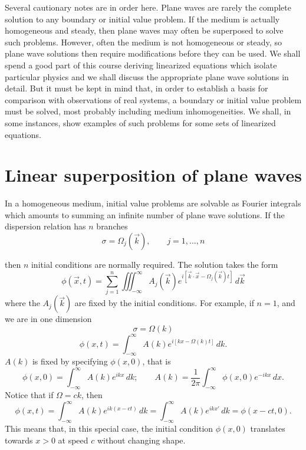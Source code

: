 Several cautionary notes are in order here. Plane waves are rarely the complete solution
to any boundary or initial value problem. If the medium is actually homogeneous and
steady, then plane waves may often be superposed to solve such problems. However,
often the medium is not homogeneous or steady, so plane wave solutions then require
modifications before they can be used. We shall spend a good part of this course
deriving linearized equations which isolate particular physics and we shall discuss the
appropriate plane wave solutions in detail. But it must be kept in mind that, in order
to establish a basis for comparison with observations of real systems, a boundary or
initial value problem must be solved, most probably including medium inhomogeneities.
We shall, in some instances, show examples of such problems for some sets of linearized
equations.

\section{Linear superposition of plane waves}

In a homogeneous medium, initial value problems are solvable as Fourier integrals which
amounts to summing an infinite number of plane wave solutions. If the dispersion
relation has $n$ branches
\[
	\sigma=\Omega_j(\vec{k}),\qquad j=1,\ldots,n
\]

\sourcepagebreak

then $n$ initial conditions are normally required. The solution takes the form
\[
	\phi(\vec{x},t)=\sum_{j=1}^n
	\iiint_{-\infty}^{\infty}
	A_j(\vec{k})e^{i[\vec{k}\cdot\vec{x}-\Omega_j(\vec{k})t]}
	\,d\vec{k}
\]
where the $A_j(\vec{k})$ are fixed by the initial conditions. For example, if $n=1$,
and we are in one dimension
\[
	\sigma=\Omega(k)
\]
\[
	\phi(x,t)=\int_{-\infty}^{\infty}
	A(k)e^{i[kx-\Omega(k)t]}
	\,dk.
\]
$A(k)$ is fixed by specifying $\phi(x,0)$, that is
\[
	\phi(x,0)=\int_{-\infty}^{\infty}A(k)e^{ikx}\,dk;
	\qquad
	A(k)=\frac{1}{2\pi}\int_{-\infty}^{\infty}\phi(x,0)e^{-ikx}\,dx.
\]
Notice that if $\Omega=ck$, then
\[
	\phi(x,t)=\int_{-\infty}^{\infty}A(k)e^{ik(x-ct)}\,dk
	=\int_{-\infty}^{\infty}A(k)e^{ikx'}\,dk
	=\phi(x-ct,0).
\]
This means that, in this special case, the initial condition $\phi(x,0)$ translates
towards $x>0$ at speed $c$ without changing shape.

